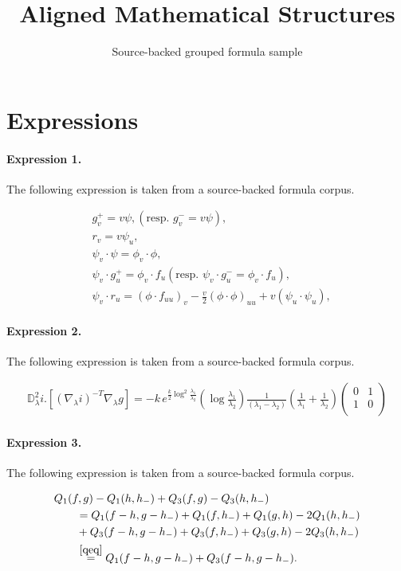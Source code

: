 \documentclass[11pt]{article}
\title{Aligned Mathematical Structures}
\author{Source-backed grouped formula sample}
\date{}
\begin{document}
\maketitle
\section{Expressions}
\paragraph{Expression 1.} The following expression is taken from a source-backed formula corpus.

\begin{align*} & g^{+}_v=v \psi, (\text{resp. } g^{-}_v=v \psi), \\ & r_v=v \psi_u, \\ & \psi_v\cdot \psi=\phi_v\cdot \phi, \\ & \psi_v\cdot g^{+}_u =\phi_v\cdot f_u (\text{resp. } \psi_v\cdot g^{-}_u=\phi_v\cdot f_u), \\ & \psi_v\cdot r_{u} =(\phi\cdot f_{uu})_v -\frac{v}2{(\phi\cdot \phi)_{uu}}+v (\psi_u\cdot \psi_u) , \end{align*}

\paragraph{Expression 2.} The following expression is taken from a source-backed formula corpus.

\begin{align*}\mathbb{D}^2_\lambda i.[(\nabla_\lambda i)^{-T}\nabla_\lambda g]=- k\,e^{\frac{k}{2} \log ^2\frac{\lambda_1}{\lambda_2}} \left(\log \frac{\lambda_1}{\lambda_2}\right)\frac{1}{(\lambda_1-\lambda_2)}\left(\frac{1}{\lambda_1}+\frac{1}{ \lambda_2}\right)\left(\begin{array}{cc} 0 & 1 \\ 1 & 0 \\\end{array}\right)\end{align*}

\paragraph{Expression 3.} The following expression is taken from a source-backed formula corpus.

\begin{align*}\begin{aligned}&Q_{1}(f,g)- Q_{1}(h,h_{-}) +Q_{3}(f,g)- Q_{3}(h,h_{-})\\&\qquad=Q_{1}(f-h,g-h_{-}) + Q_{1}(f,h_{-}) + Q_{1}(g,h) - 2Q_{1}(h,h_{-})\\&\qquad+Q_{3}(f-h,g-h_{-}) + Q_{3}(f,h_{-}) + Q_{3}(g,h) - 2Q_{3}(h,h_{-})\\&\qquad\stackrel{\eqref{qeq}}{=} Q_{1}(f-h,g-h_{-})+ Q_{3}(f-h,g-h_{-}).\end{aligned}\end{align*}
\end{document}
